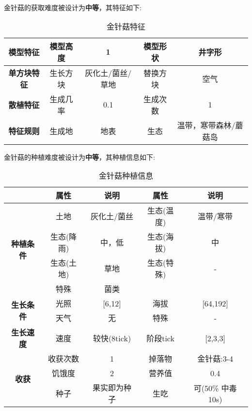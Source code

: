 金针菇的获取难度被设计为\textbf{中等}，其特征如下:
\begin{table}[H]
    \centering
    \caption{金针菇特征}
    \label{table:金针菇特征}
    \setlength{\tabcolsep}{4mm}
    \begin{tabular}{c|cc|cc}
        \toprule
        \textbf{模型特征}   & 模型高度 & 1      & 模型形状 & 井字形     \\
        \midrule
        \textbf{单方块特征} & 生长方块 & 灰化土/菌丝/草地 & 替换方块 & 空气     \\
        \midrule
        \textbf{散植特征}   & 生成几率 & 0.1   & 生成次数 & 1        \\
        \midrule
        \textbf{特征规则}   & 生成地   & 地表   & 生态     & 温带，寒带森林/蘑菇岛 \\
        \bottomrule
    \end{tabular}
\end{table}


金针菇的种植难度被设计为\textbf{中等}，其种植信息如下:

\begin{table}[H]
    \centering
    \caption{金针菇种植信息}
    \label{table:金针菇种植信息}
    \setlength{\tabcolsep}{4mm}
    \begin{tabular}{c|cc|cc}
        \toprule
                                           & \textbf{属性} & \textbf{说明} & \textbf{属性} & \textbf{说明} \\
        \midrule
        \multirow{4}{*}{\textbf{种植条件}} & 土地          &  灰化土/菌丝         & 生态(温度)    & 温带/寒带    \\
                                           & 生态(降雨)    & 中，低        & 生态(海拔)    & 中            \\
                                           & 生态(土地)    & 草地          & 生态(特殊)    & -             \\
                                           & 特殊          & 菌类           \\
        \midrule
        \multirow{2}{*}{\textbf{生长条件}} & 光照          & [6,12]        & 海拔          & [64,192]      \\
                                           & 天气          & 无            & 特殊          & -             \\
        \midrule
        \textbf{生长速度}                  & 速度          & 较快(8tick)     & 阶段tick      & [2,3,3]       \\
        \midrule
        \multirow{3}{*}{\textbf{收获}}     & 收获次数      & 1             & 掉落物        & 金针菇:3-4      \\
                                           & 饥饿度        & 2             & 营养值        & 0.4           \\
                                           & 种子          & 果实即为种子  & 生吃          & 可(50\% 中毒 10s)   \\
        \bottomrule
    \end{tabular}
\end{table}

